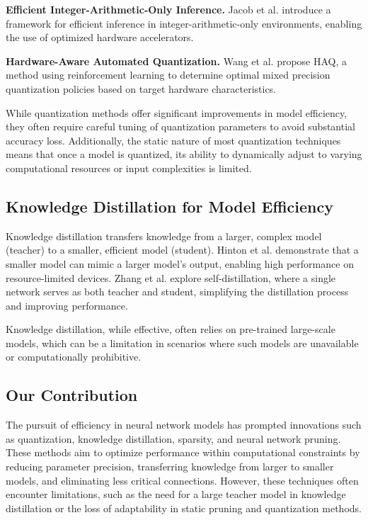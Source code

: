 \textbf{Efficient Integer-Arithmetic-Only Inference.} Jacob et al. \cite{jacob2018quantization} introduce a framework for efficient inference in integer-arithmetic-only environments, enabling the use of optimized hardware accelerators.

\textbf{Hardware-Aware Automated Quantization.} Wang et al. \cite{wang2019haq} propose HAQ, a method using reinforcement learning to determine optimal mixed precision quantization policies based on target hardware characteristics.

While quantization methods offer significant improvements in model efficiency, they often require careful tuning of quantization parameters to avoid substantial accuracy loss. Additionally, the static nature of most quantization techniques means that once a model is quantized, its ability to dynamically adjust to varying computational resources or input complexities is limited.

\subsection{Knowledge Distillation for Model Efficiency}

Knowledge distillation transfers knowledge from a larger, complex model (teacher) to a smaller, efficient model (student). Hinton et al. \cite{hinton2015distilling} demonstrate that a smaller model can mimic a larger model's output, enabling high performance on resource-limited devices. Zhang et al. \cite{zhang2019your} explore self-distillation, where a single network serves as both teacher and student, simplifying the distillation process and improving performance.

Knowledge distillation, while effective, often relies on pre-trained large-scale models, which can be a limitation in scenarios where such models are unavailable or computationally prohibitive.

\subsection{Our Contribution}

The pursuit of efficiency in neural network models has prompted innovations such as quantization, knowledge distillation, sparsity, and neural network pruning. These methods aim to optimize performance within computational constraints by reducing parameter precision, transferring knowledge from larger to smaller models, and eliminating less critical connections. However, these techniques often encounter limitations, such as the need for a large teacher model in knowledge distillation or the loss of adaptability in static pruning and quantization methods.

